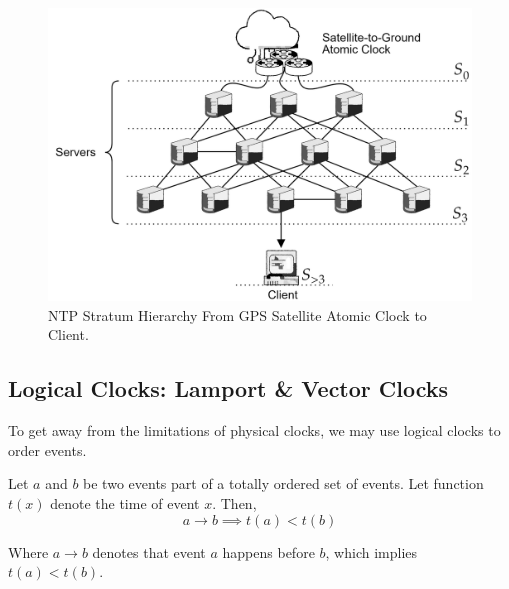 \vspace{-1em}
\begin{figure}[h]
    \includegraphics[width=.9\textwidth]{./Sections/time/sat.png}
    \caption{NTP Stratum Hierarchy From GPS Satellite Atomic Clock to Client.}
\end{figure}

\newpage 
\subsection{Logical Clocks: Lamport \& Vector Clocks}

\label{sec:logical_clocks}
\noindent
To get away from the limitations of physical clocks, we may use logical clocks to order events.

\begin{Def}

    Let $a$ and $b$ be two events part of a totally ordered set of events. Let function $t(x)$ denote the time of event $x$. Then,
    \[ a \rightarrow b \implies t(a) < t(b) \]

    \noindent
    Where $a \rightarrow b$ denotes that event $a$ happens before $b$, which implies $t(a) < t(b)$.
\end{Def}

